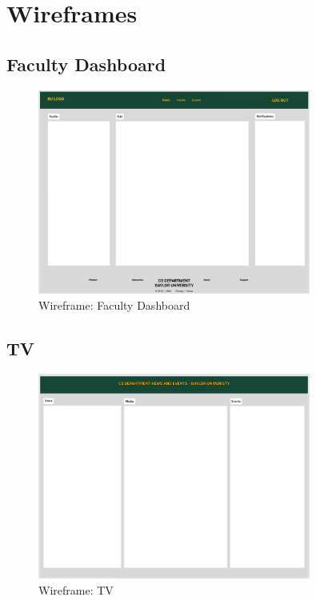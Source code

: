 \documentclass{article}
\begin{document}
\section{Wireframes}
\subsection{Faculty Dashboard}
\begin{figure}[H]
    \centering
    \includegraphics[width=0.8\textwidth]{images/wireframe_FacultyDashboard.png}
    \centering
    \caption{Wireframe: Faculty Dashboard}
\end{figure}

\subsection{TV}
\begin{figure}[H]
    \centering
    \includegraphics[width=0.8\textwidth]{images/wireframe_TV_Display.png}
    \centering
    \caption{Wireframe: TV}
\end{figure}
\end{document}
